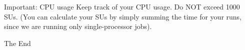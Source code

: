 \documentclass[aspectratio=169]{beamer}
\begin{document}
\begin{frame}{Important: CPU usage}
Keep track of your CPU usage.\newline
\newline 
Do NOT exceed 1000 SUs. (You can calculate your SUs by simply summing the time for your runs, since we are running only single-processor jobs).
\end{frame} 
    


%     
%     

    \begin{frame}
        \Huge{\centerline{The End}}
    \end{frame}
\end{document}
